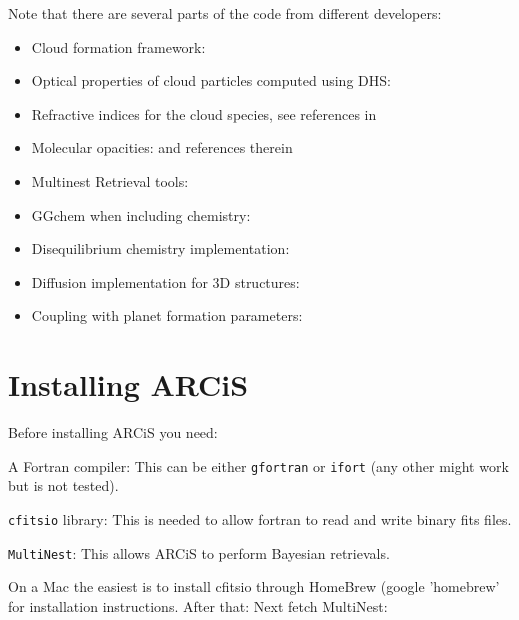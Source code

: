 \documentclass[12pt]{article}
\begin{document}
Note that there are several parts of the code from different developers:
\begin{itemize}
\item Cloud formation framework: \cite{2019A&A...622A.121O}
\item Optical properties of cloud particles computed using DHS: \cite{2005A&A...432..909M, 1981ApOpt..20.3657T}
\item Refractive indices for the cloud species, see references in \cite{2020A&A...642A..28M}
\item Molecular opacities: \cite{2021A&A...646A..21C} and references therein
\item Multinest Retrieval tools: \cite{2008MNRAS.384..449F, 2009MNRAS.398.1601F, 2019OJAp....2E..10F}
\item GGchem when including chemistry: \cite{2018A&A...614A...1W}
\item Disequilibrium chemistry implementation: \cite{2021A&A...656A..90K}
\item Diffusion implementation for 3D structures: \cite{2022A&A...665A...2C}
\item Coupling with planet formation parameters: \cite{2022A&A...667A.147K}
\end{itemize}

\section{Installing ARCiS}

Before installing ARCiS you need:
\begin{description}
\item{A Fortran compiler:} This can be either \texttt{gfortran} or \texttt{ifort} (any other might work but is not tested).
\item{\texttt{cfitsio} library:} This is needed to allow fortran to read and write binary fits files.
\item{\texttt{MultiNest}:} This allows ARCiS to perform Bayesian retrievals.
\end{description}

On a Mac the easiest is to install cfitsio through HomeBrew (google 'homebrew' for installation instructions. After that:
%
%
Next fetch MultiNest:
%
\vspace{-2cm}\\
\vspace{-2cm}\\
\vspace{-2cm}\\
\vspace{-2cm}\\
\end{document}
